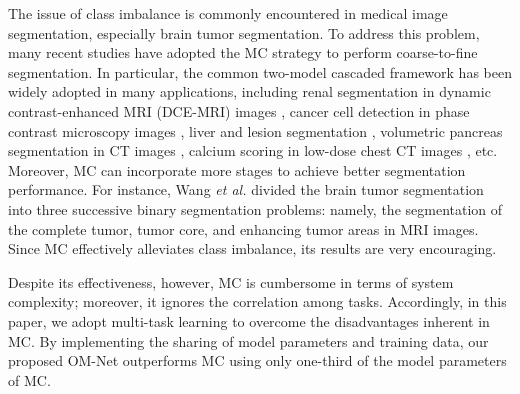\documentclass[journal,twoside]{IEEEtran}
\begin{document}
The issue of class imbalance is commonly encountered in medical image segmentation, especially brain tumor segmentation. To address this problem, many recent studies have adopted the MC strategy \cite{haghighi2018automatic,hu2017detection,christ2016automatic,zhu20173d,lessmann2018automatic,zhang2017detecting,guo2017framework,tang2017scene,wang2017automatic} to perform coarse-to-fine segmentation. In particular, the common two-model cascaded framework has been widely adopted in many applications, including renal segmentation in dynamic contrast-enhanced MRI (DCE-MRI) images \cite{haghighi2018automatic}, cancer cell detection in phase contrast microscopy images \cite{ hu2017detection }, liver and lesion segmentation \cite{ christ2016automatic }, volumetric pancreas segmentation in CT images \cite{ zhu20173d}, calcium scoring in low-dose chest CT images \cite{lessmann2018automatic}, etc. Moreover, MC can incorporate more stages to achieve better segmentation performance. For instance, Wang \emph{et al.} \cite{wang2017automatic} divided the brain tumor segmentation into three successive binary segmentation problems: namely, the segmentation of the complete tumor, tumor core, and enhancing tumor areas in MRI images. Since MC effectively alleviates class imbalance, its results are very encouraging.



Despite its effectiveness, however, MC is cumbersome in terms of system complexity; moreover, it ignores the correlation among tasks. Accordingly, in this paper, we adopt multi-task learning to overcome the disadvantages inherent in MC. By implementing the sharing of model parameters and training data, our proposed OM-Net outperforms MC using only one-third of the model parameters of MC. 
\end{document}
